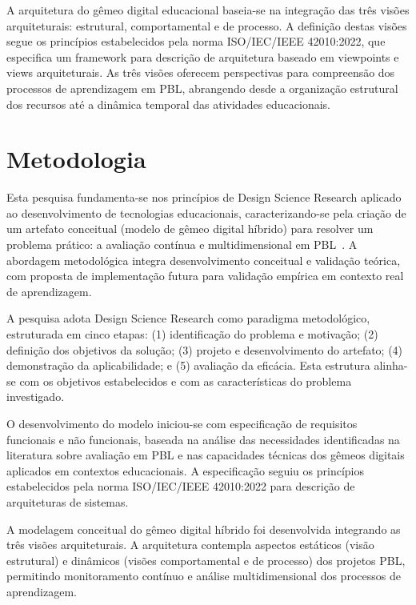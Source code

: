 \documentclass[english, spanish, brazilian]{modelo_dt}
\begin{document}
A arquitetura do gêmeo digital educacional baseia-se na integração das três visões arquiteturais: estrutural, comportamental e de processo\@. A definição destas visões segue os princípios estabelecidos pela norma ISO/IEC/IEEE 42010:2022, que especifica um framework para descrição de arquitetura baseado em viewpoints e views arquiteturais\@. As três visões oferecem perspectivas para compreensão dos processos de aprendizagem em PBL, abrangendo desde a organização estrutural dos recursos até a dinâmica temporal das atividades educacionais\@.

\section{Metodologia}

Esta pesquisa fundamenta-se nos princípios de Design Science Research aplicado ao desenvolvimento de tecnologias educacionais, caracterizando-se pela criação de um artefato conceitual (modelo de gêmeo digital híbrido) para resolver um problema prático: a avaliação contínua e multidimensional em PBL~\parencite{modrakowski2024architecture}. A abordagem metodológica integra desenvolvimento conceitual e validação teórica, com proposta de implementação futura para validação empírica em contexto real de aprendizagem.

A pesquisa adota Design Science Research como paradigma metodológico, estruturada em cinco etapas: (1) identificação do problema e motivação; (2) definição dos objetivos da solução; (3) projeto e desenvolvimento do artefato; (4) demonstração da aplicabilidade; e (5) avaliação da eficácia. Esta estrutura alinha-se com os objetivos estabelecidos e com as características do problema investigado.

O desenvolvimento do modelo iniciou-se com especificação de requisitos funcionais e não funcionais, baseada na análise das necessidades identificadas na literatura sobre avaliação em PBL e nas capacidades técnicas dos gêmeos digitais aplicados em contextos educacionais. A especificação seguiu os princípios estabelecidos pela norma ISO/IEC/IEEE 42010:2022 para descrição de arquiteturas de sistemas.

A modelagem conceitual do gêmeo digital híbrido foi desenvolvida integrando as três visões arquiteturais\@. A arquitetura contempla aspectos estáticos (visão estrutural) e dinâmicos (visões comportamental e de processo) dos projetos PBL, permitindo monitoramento contínuo e análise multidimensional dos processos de aprendizagem\@.
\end{document}
